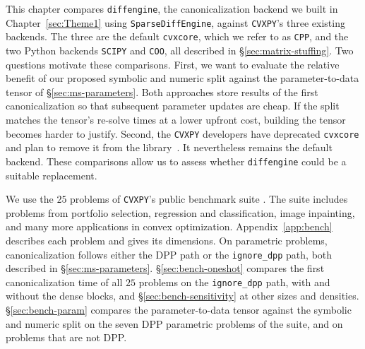 \label{sec:Theme2}

This chapter compares \texttt{diffengine}, the canonicalization backend we built in
Chapter~\ref{sec:Theme1} using \texttt{SparseDiffEngine}, against \texttt{CVXPY}'s three
existing backends. The three are the
default \texttt{cvxcore}, which we refer to as \texttt{CPP}, and the two Python
backends \texttt{SCIPY} and \texttt{COO}, all described in \S\ref{sec:matrix-stuffing}.
Two questions motivate these comparisons.
First, we want to evaluate the relative benefit of our proposed symbolic and numeric split
against the parameter-to-data tensor of \S\ref{sec:ms-parameters}. Both approaches store
results of the first
canonicalization so that subsequent parameter updates are cheap.
If the split matches the tensor's re-solve
times at a lower upfront cost, building the tensor becomes harder to justify.
Second, the \texttt{CVXPY} developers have deprecated \texttt{cvxcore} and plan
to remove it from the library~\cite{zhang2026cvxpy}. It nevertheless remains the default
backend. These comparisons allow us to assess whether
\texttt{diffengine} could be a suitable replacement.

We use the $25$ problems of \texttt{CVXPY}'s public benchmark suite
\cite{cvxpybenchmarks}. The suite includes problems from portfolio selection, regression
and classification, image inpainting, and many more applications in convex optimization.
Appendix~\ref{app:bench} describes each problem and gives its dimensions.
On parametric problems, canonicalization follows either
the \ac{DPP} path or the \texttt{ignore\_dpp} path, both described in
\S\ref{sec:ms-parameters}. \S\ref{sec:bench-oneshot} compares the first canonicalization time
of all $25$ problems on the \texttt{ignore\_dpp} path, with and without the dense blocks, and
\S\ref{sec:bench-sensitivity} at other sizes and densities. \S\ref{sec:bench-param} compares the parameter-to-data tensor
against the symbolic and numeric split on the seven \ac{DPP} parametric problems of the suite,
and on problems that are not \ac{DPP}.

